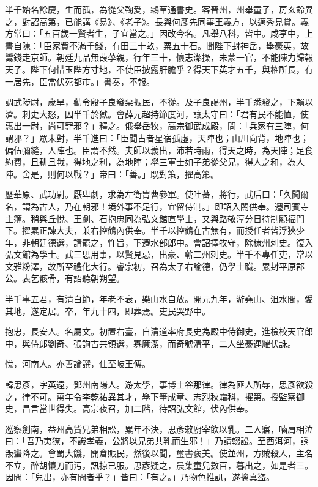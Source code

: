 \begin{pinyinscope}
 半千始名餘慶，生而孤，為從父鞠愛，鸘草通書史。客晉州，州舉童子，房玄齡異之，對詔高第，已能講《易》、《老子》。長與何彥先同事王義方，以邁秀見賞。義方常曰：「五百歲一賢者生，子宜當之。」因改今名。凡舉八科，皆中。咸亨中，上書自陳：「臣家貲不滿千錢，有田三十畝，粟五十石。聞陛下封神岳，舉豪英，故鬻錢走京師。朝廷九品無葭莩親，行年三十，懷志潔操，未蒙一官，不能陳力歸報天子。陛下何惜玉陛方寸地，不使臣披露肝膽乎？得天下英才五千，與榷所長，有一居先，臣當伏死都市。」書奏，不報。



 調武陟尉，歲旱，勸令殷子良發粟振民，不從。及子良謁州，半千悉發之，下賴以濟。刺史大怒，囚半千於獄。會薛元超持節度河，讓太守曰：「君有民不能恤，使惠出一尉，尚可罪邪？」釋之。俄舉岳牧，高宗御武成殿，問：「兵家有三陣，何謂邪？」眾未對，半千進曰：「臣聞古者星宿孤虛，天陣也；山川向背，地陣也；偏伍彌縫，人陣也。臣謂不然。夫師以義出，沛若時雨，得天之時，為天陣；足食約費，且耕且戰，得地之利，為地陣；舉三軍士如子弟從父兄，得人之和，為人陣。舍是，則何以戰？」帝曰：「善。」既對策，擢高第。



 歷華原、武功尉。厭卑劇，求為左衛胄曹參軍。使吐蕃，將行，武后曰：「久聞爾名，謂為古人，乃在朝邪！境外事不足行，宜留侍制。」即詔入閤供奉。遷司賓寺主簿。稍與丘悅、王劇、石抱忠同為弘文館直學士，又與路敬淳分日待制顯福門下。擢累正諫大夫，兼右控鶴內供奉。半千以控鶴在古無有，而授任者皆浮狹少年，非朝廷德選，請罷之，忤旨，下遷水部郎中。會詔擇牧守，除棣州刺史。復入弘文館為學士。武三思用事，以賢見忌，出豪、蘄二州刺史。半千不專任吏，常以文雅粉澤，故所至禮化大行。睿宗初，召為太子右諭德，仍學士職。累封平原郡公。表乞骸骨，有詔聽朝朔望。



 半千事五君，有清白節，年老不衰，樂山水自放。開元九年，游堯山、沮水間，愛其地，遂定居。卒，年九十四，即葬焉。吏民哭野中。



 抱忠，長安人。名屬文。初置右臺，自清道率府長史為殿中侍御史，進檢校天官郎中，與侍郎劉奇、張詢古共領選，寡廉潔，而奇號清平，二人坐綦連耀伏誅。



 悅，河南人。亦善論譔，仕至岐王傅。



 韓思彥，字英遠，鄧州南陽人。游太學，事博士谷那律。律為匪人所辱，思彥欲殺之，律不可。萬年令李乾祐異其才，舉下筆成章、志烈秋霜科，擢第。授監察御史，昌言當世得失。高宗夜召，加二階，待詔弘文館，伏內供奉。



 巡察劍南，益州高貲兄弟相訟，累年不決，思彥敕廚宰飲以乳。二人寤，嚙肩相泣曰：「吾乃夷獠，不識孝義，公將以兄弟共乳而生邪！」乃請輟訟。至西洱河，誘叛蠻降之。會蜀大饑，開倉賑民，然後以聞，璽書褒美。使並州，方賊殺人，主名不立，醉胡懷刀而污，訊掠已服。思彥疑之，晨集童兒數百，暮出之，如是者三。因問：「兒出，亦有問者乎？」皆曰：「有之。」乃物色推訊，遂擒真盜。




\end{pinyinscope}
